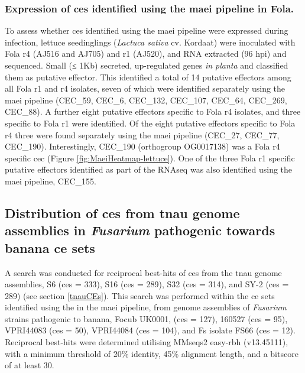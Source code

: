 \subsubsection{Expression of \aclp{ce} identified using the \ac{maei} pipeline in \acl{Fola}.}

To assess whether \acp{ce} identified using the \ac{maei} pipeline were expressed during infection, lettuce seedinglings (\textit{Lactuca sativa} cv. Kordaat) were inoculated with \ac{Fola} \ac{r4} (AJ516 and AJ705) and \ac{r1} (AJ520), and RNA extracted (96 \ac{hpi}) and sequenced. Small (≤ 1Kb) secreted,
up-regulated genes \textit{in planta} and classified them as putative effector. This identified a total of 14 putative effectors among all  \ac{Fola} \ac{r1} and \ac{r4} isolates, seven of which  were identified separately using the \ac{maei} pipeline (CEC\_59, CEC\_6, CEC\_132, CEC\_107, CEC\_64, CEC\_269, CEC\_88). A further eight putative effectors specific to \ac{Fola} \ac{r4} isolates, and three specific to \ac{Fola} \ac{r1} were identified. Of the eight putative effectors specific to \ac{Fola} \ac{r4} three were found separately using the \ac{maei} pipeline (CEC\_27, CEC\_77, CEC\_190). Interestingly, CEC\_190 (orthogroup OG0017138) was a \ac{Fola} \ac{r4} specific \ac{cec} (Figure \ref{fig:MaeiHeatmap-lettuce}). One of the three \ac{Fola} \ac{r1} specific putative effectors identified as part of the RNAseq was also identified using the \ac{maei} pipeline, CEC\_155. 

\subsection{Distribution of \aclp{ce} from \ac{tnau} genome assemblies in \textit{Fusarium} pathogenic towards banana \ac{ce} sets}

A search was conducted for reciprocal best-hits of \acp{ce} from the \ac{tnau} genome assemblies, S6 (\acp{ce} = 333), S16  (\acp{ce} = 289), S32 (\acp{ce} = 314), and SY-2 (\acp{ce} = 289) (see section \ref{tnauCEs}). This search was performed within the \ac{ce} sets identified using the in the \ac{maei} pipeline, from genome assemblies of \textit{Fusarium} strains pathogenic to banana, \ac{Focub} UK0001, (\acp{ce} = 127), 160527 (\acp{ce} = 95), VPRI44083 (\acp{ce} = 50), VPRI44084 (\acp{ce} = 104), and \ac{Fs} isolate FS66 (\acp{ce} = 12). Reciprocal best-hits were determined utilising MMseqs2 easy-rbh (v13.45111), with a minimum threshold of 20\% identity, 45\% alignment length, and a bitscore of at least 30. 

